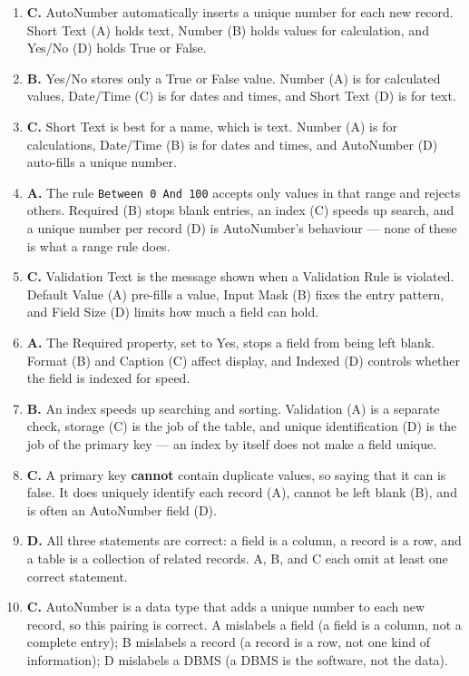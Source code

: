 \documentclass[11pt]{article}
\begin{document}
\begin{enumerate}[label=\textbf{Q\arabic*.}, leftmargin=*]
  (B) stores the data, an index (C) speeds up search, and a data type (D)
  describes the kind of value a field holds.
\item \textbf{C.} AutoNumber automatically inserts a unique number for each
  new record. Short Text (A) holds text, Number (B) holds values for
  calculation, and Yes/No (D) holds True or False.
\item \textbf{B.} Yes/No stores only a True or False value. Number (A) is for
  calculated values, Date/Time (C) is for dates and times, and Short Text (D)
  is for text.
\item \textbf{C.} Short Text is best for a name, which is text. Number (A)
  is for calculations, Date/Time (B) is for dates and times, and AutoNumber
  (D) auto-fills a unique number.
\item \textbf{A.} The rule \texttt{Between 0 And 100} accepts only values in
  that range and rejects others. Required (B) stops blank entries, an index
  (C) speeds up search, and a unique number per record (D) is AutoNumber's
  behaviour --- none of these is what a range rule does.
\item \textbf{C.} Validation Text is the message shown when a Validation Rule
  is violated. Default Value (A) pre-fills a value, Input Mask (B) fixes the
  entry pattern, and Field Size (D) limits how much a field can hold.
\item \textbf{A.} The Required property, set to Yes, stops a field from being
  left blank. Format (B) and Caption (C) affect display, and Indexed (D)
  controls whether the field is indexed for speed.
\item \textbf{B.} An index speeds up searching and sorting. Validation (A) is
  a separate check, storage (C) is the job of the table, and unique
  identification (D) is the job of the primary key --- an index by itself
  does not make a field unique.
\item \textbf{C.} A primary key \textbf{cannot} contain duplicate values, so
  saying that it can is false. It does uniquely identify each record (A),
  cannot be left blank (B), and is often an AutoNumber field (D).
\item \textbf{D.} All three statements are correct: a field is a column, a
  record is a row, and a table is a collection of related records. A, B, and
  C each omit at least one correct statement.
\item \textbf{C.} AutoNumber is a data type that adds a unique number to each
  new record, so this pairing is correct. A mislabels a field (a field is a
  column, not a complete entry); B mislabels a record (a record is a row, not
  one kind of information); D mislabels a DBMS (a DBMS is the software, not
  the data).


\end{enumerate}
\end{document}
